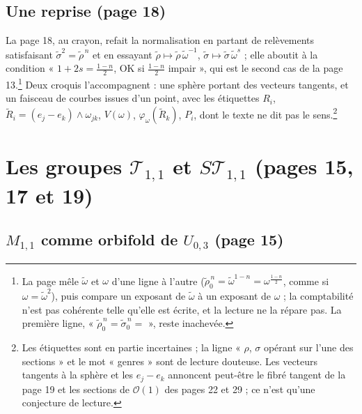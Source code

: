 \documentclass[11pt,a4paper]{article}
\begin{document}
\subsection*{Une reprise (page 18)}

La page 18, au crayon, refait la normalisation en partant de relèvements
satisfaisant $\tilde\sigma^2 = \tilde\rho^{\,n}$ et en essayant
$\tilde\rho \mapsto \tilde\rho\,\tilde\omega^{-1}$, $\tilde\sigma \mapsto
\tilde\sigma\,\tilde\omega^{s}$ ; elle aboutit à la condition
« $1 + 2s = \frac{1-n}{2}$, OK si $\frac{1-n}{2}$ impair », qui est le second cas
de la page 13.\footnote{La page mêle $\tilde\omega$ et $\omega$ d'une ligne à
l'autre ($\tilde\rho_0^{\,n} = \tilde\omega^{1-n} = \omega^{\frac{1-n}{2}}$,
comme si $\omega = \tilde\omega^2$), puis compare un exposant de $\tilde\omega$ à
un exposant de $\omega$ ; la comptabilité n'est pas cohérente telle qu'elle est
écrite, et la lecture ne la répare pas. La première ligne,
« $\tilde\rho_0^{\,n} = \tilde\sigma_0^{\,n} =$ », reste inachevée.} Deux croquis
l'accompagnent : une sphère portant des vecteurs tangents, et un faisceau de
courbes issues d'un point, avec les étiquettes $R_i$,
$\tilde R_i = (e_j - e_k) \wedge \omega_{jk}$, $V(\omega)$,
$\varphi_\omega(\tilde R_k)$, $P_i$, dont le texte ne dit pas le
sens.\footnote{Les étiquettes sont en partie incertaines ; la ligne
« $\rho$, $\sigma$ opérant sur l'une des sections » et le mot « genres » sont de
lecture douteuse. Les vecteurs tangents à la sphère et les $e_j - e_k$
annoncent peut-être le fibré tangent de la page 19 et les sections de
$\mathcal{O}(1)$ des pages 22 et 29 ; ce n'est qu'une conjecture de lecture.}

\section*{Les groupes $\mathcal{T}_{1,1}$ et $S\mathcal{T}_{1,1}$ (pages 15, 17 et 19)}

\subsection*{$M_{1,1}$ comme orbifold de $U_{0,3}$ (page 15)}
\end{document}
